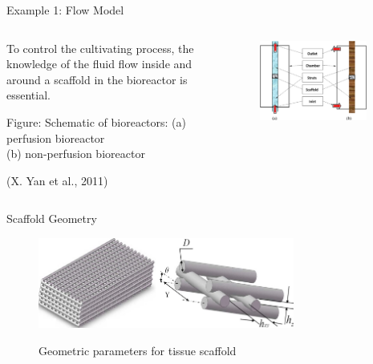 \documentclass[11pt,t]{beamer}
\begin{document}
\begin{frame}[fragile]{Example 1: Flow Model}

		\begin{columns}[t]
		\begin{column}{.45\textwidth}
			To control the cultivating process, the knowledge of the fluid flow
inside and around a scaffold in the bioreactor is essential.

\vspace{20pt}
Figure: Schematic of bioreactors: (a) perfusion bioreactor\\(b) non-perfusion bioreactor

\vspace{20pt}
\footnotesize(X. Yan et al., 2011)

		\end{column}
		\begin{column}{.55\textwidth}
			\vspace{-20pt}
			\begin{figure}
			\centering
			\includegraphics[width=0.9\textwidth]{flow_scheme}
			
			\end{figure}
		\end{column}
	\end{columns}

\end{frame}

\begin{frame}[fragile]{Scaffold Geometry}  

			\begin{figure}
			\centering
			\includegraphics[width=0.75\textwidth]{flow_scaffold}
			
			\vspace{15pt}
			\footnotesize Geometric parameters for tissue scaffold
			\end{figure}

\end{frame}
\end{document}
